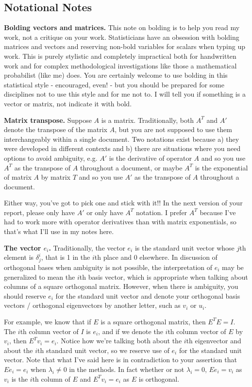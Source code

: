 \documentclass[12pt]{article}
\begin{document}
\subsection*{Notational Notes}


{\bf Bolding vectors and matrices.} This note on bolding is to help you read my work, not a critique on your work. Statisticians have an obsession with bolding matrices and vectors and reserving non-bold variables for scalars when typing up work. This is purely stylistic and completely impractical both for handwritten work and for complex methodological investigations like those a mathematical probabilist (like me) does. You are certainly welcome to use bolding in this statistical style - encouraged, even! - but you should be prepared for some disciplines not to use this style and for me not to. I will tell you if something is a vector or matrix, not indicate it with bold. 

{\bf Matrix transpose.}
Suppose $A$ is a matrix. Traditionally, both $A^T$ and $A'$ denote the transpose of the matrix $A$, but you are not supposed to use them interchangeably within a single document. Two notations exist because a) they were developed in different contexts and b) there are situations where you need options to avoid ambiguity, e.g. $A'$ is the derivative of operator $A$ and so you use $A^T$ as the transpose of $A$ throughout a document, or maybe $A^T$ is the exponential of matrix $A$ by matrix $T$ and so you use $A'$ as the transpose of $A$ throughout a document.

Either way, you've got to pick one and stick with it!! In the next version of your report, please only have $A'$ or only have $A^T$ notation. I prefer $A^T$ because I've had to work more with operator derivatives than with matrix exponentials, so that's what I'll use in my notes here.

{\bf The vector $e_i$.} Traditionally, the vector $e_i$ is the standard unit vector whose $j$th element is $\delta_j^i$, that is 1 in the $i$th place and 0 elsewhere. In discussion of orthogonal bases when ambiguity is not possible, the interpretation of $e_i$ may be generalized to mean the $i$th basis vector, which is appropriate when talking about columns of a square orthogonal matrix. However, when there is ambiguity, you should reserve $e_i$ for the standard unit vector and denote your orthogonal basis vectors / orthogonal eigenvectors by another letter, such as $v_i$ or $u_i$. 

For example, we know that if $E$ is a square orthogonal matrix, then $E^TE=I$. The $i$th column vector of $I$ is $e_i$, and if we denote the $i$th column vector of $E$ by $v_i$, then $E^Tv_i=e_i$. Notice how we're talking both about the $i$th eigenvector and about the $i$th standard unit vector, so we reserve use of $e_i$ for the standard unit vector. Note that what I've said here is in contradiction to your assertion that $Ee_i=e_i$ when $\lambda_i\neq 0$ in the methods. In fact whether or not $\lambda_i=0$, $Ee_i=v_i$ as $v_i$ is the $i$th column of $E$ and $E^Tv_i=e_i$ as $E$ is orthogonal.
\end{document}
